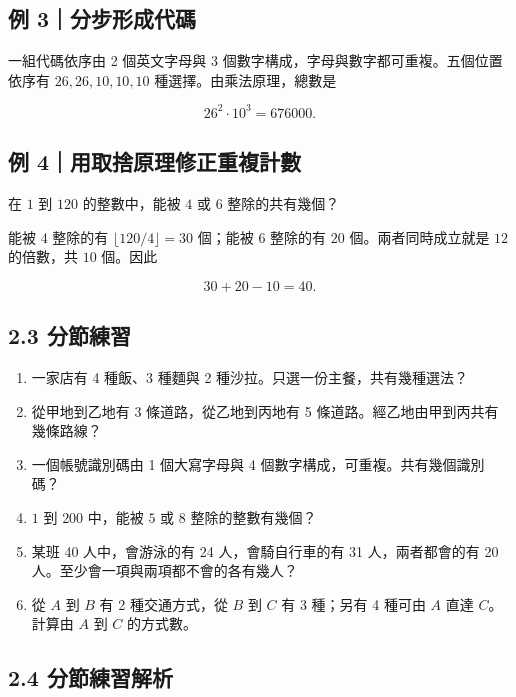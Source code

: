 \documentclass[11pt,a4paper]{article}
\providecommand{\tightlist}{%
  \setlength{\itemsep}{0pt}\setlength{\parskip}{0pt}}
\begin{document}
\subsection{例 3｜分步形成代碼}\label{ux4f8b-3ux5206ux6b65ux5f62ux6210ux4ee3ux78bc}

一組代碼依序由 2 個英文字母與 3 個數字構成，字母與數字都可重複。五個位置依序有 \(26,26,10,10,10\) 種選擇。由乘法原理，總數是

\[
26^2\cdot10^3=676000.
\]

\subsection{例 4｜用取捨原理修正重複計數}\label{ux4f8b-4ux7528ux53d6ux6368ux539fux7406ux4feeux6b63ux91cdux8907ux8a08ux6578}

在 \(1\) 到 \(120\) 的整數中，能被 \(4\) 或 \(6\) 整除的共有幾個？

能被 \(4\) 整除的有 \(\lfloor120/4\rfloor=30\) 個；能被 \(6\) 整除的有 \(20\) 個。兩者同時成立就是 \(12\) 的倍數，共 \(10\) 個。因此

\[
30+20-10=40.
\]

\subsection{2.3 分節練習}\label{ux5206ux7bc0ux7df4ux7fd2-1}

\begin{enumerate}
\def\labelenumi{\arabic{enumi}.}
\tightlist
\item
  一家店有 4 種飯、3 種麵與 2 種沙拉。只選一份主餐，共有幾種選法？
\item
  從甲地到乙地有 3 條道路，從乙地到丙地有 5 條道路。經乙地由甲到丙共有幾條路線？
\item
  一個帳號識別碼由 1 個大寫字母與 4 個數字構成，可重複。共有幾個識別碼？
\item
  \(1\) 到 \(200\) 中，能被 \(5\) 或 \(8\) 整除的整數有幾個？
\item
  某班 40 人中，會游泳的有 24 人，會騎自行車的有 31 人，兩者都會的有 20 人。至少會一項與兩項都不會的各有幾人？
\item
  從 \(A\) 到 \(B\) 有 2 種交通方式，從 \(B\) 到 \(C\) 有 3 種；另有 4 種可由 \(A\) 直達 \(C\)。計算由 \(A\) 到 \(C\) 的方式數。
\end{enumerate}

\subsection{2.4 分節練習解析}\label{ux5206ux7bc0ux7df4ux7fd2ux89e3ux6790-1}
\end{document}
